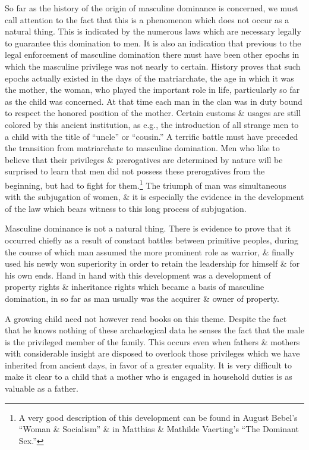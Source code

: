 \documentclass{article}
\begin{document}
So far as the history of the origin of masculine dominance is concerned, we must call attention to the fact that this is a phenomenon which does not occur as a natural thing. This is indicated by the numerous laws which are necessary legally to guarantee this domination to men. It is also an indication that previous to the legal enforcement of masculine domination there must have been other epochs in which the masculine privilege was not nearly to certain. History proves that such epochs actually existed in the days of the matriarchate, the age in which it was the mother, the woman, who played the important role in life, particularly so far as the child was concerned. At that time each man in the clan was in duty bound to respect the honored position of the mother. Certain customs \& usages are still colored by this ancient institution, as e.g., the introduction of all strange men to a child with the title of ``uncle'' or ``cousin.'' A terrific battle must have preceded the transition from matriarchate to masculine domination. Men who like to believe that their privileges \& prerogatives are determined by nature will be surprised to learn that men did not possess these prerogatives from the beginning, but had to fight for them.\footnote{A very good description of this development can be found in August Bebel's ``Woman \& Socialism'' \& in Matthias \& Mathilde Vaerting's ``The Dominant Sex.''} The triumph of man was simultaneous with the subjugation of women, \& it is especially the evidence in the development of the law which bears witness to this long process of subjugation.

Masculine dominance is not a natural thing. There is evidence to prove that it occurred chiefly as a result of constant battles between primitive peoples, during the course of which man assumed the more prominent role as warrior, \& finally used his newly won superiority in order to retain the leadership for himself \& for his own ends. Hand in hand with this development was a development of property rights \& inheritance rights which became a basis of masculine domination, in so far as man usually was the acquirer \& owner of property.

A growing child need not however read books on this theme. Despite the fact that he knows nothing of these archaelogical data he senses the fact that the male is the privileged member of the family. This occurs even when fathers \& mothers with considerable insight are disposed to overlook those privileges which we have inherited from ancient days, in favor of a greater equality. It is very difficult to make it clear to a child that a mother who is engaged in household duties is as valuable as a father.
\end{document}
